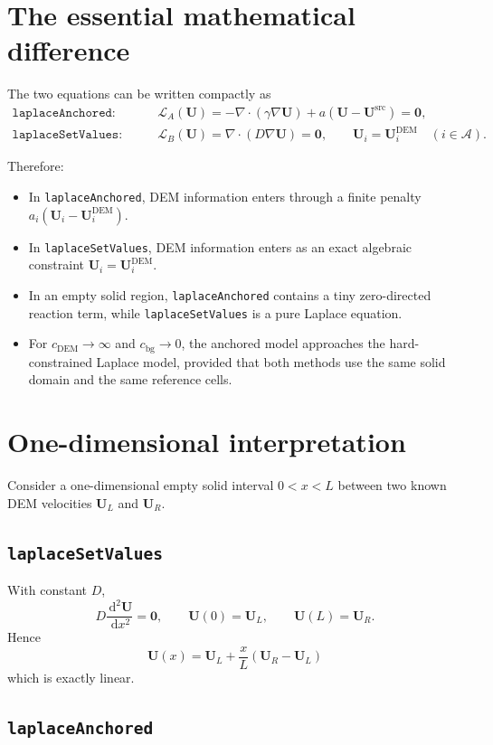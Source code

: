 \documentclass[11pt,a4paper]{article}
\newcommand{\U}{\bm{U}}
\newcommand{\Ud}{\bm{U}^{\mathrm{DEM}}}
\newcommand{\Usrc}{\bm{U}^{\mathrm{src}}}
\newcommand{\dd}{\,\mathrm{d}}
\begin{document}
\section{The essential mathematical difference}

The two equations can be written compactly as
\begin{align}
\texttt{laplaceAnchored:}\qquad
&
\mathcal L_A(\U)
=
-\nabla\cdot(\gamma\nabla\U)
+a(\U-\Usrc)
=
\bm0,
\label{eq:anchcompact}\\
\texttt{laplaceSetValues:}\qquad
&
\mathcal L_B(\U)
=
\nabla\cdot(D\nabla\U)
=
\bm0,
\qquad
\U_i=\Ud_i\quad(i\in\mathcal A).
\label{eq:setcompact}
\end{align}

Therefore:

\begin{itemize}[leftmargin=1.5em]
\item In \texttt{laplaceAnchored}, DEM information enters through a finite penalty
$a_i(\U_i-\Ud_i)$.
\item In \texttt{laplaceSetValues}, DEM information enters as an exact algebraic
constraint $\U_i=\Ud_i$.
\item In an empty solid region, \texttt{laplaceAnchored} contains a tiny
zero-directed reaction term, while \texttt{laplaceSetValues} is a pure Laplace equation.
\item For $c_{\mathrm{DEM}}\rightarrow\infty$ and
$c_{\mathrm{bg}}\rightarrow0$, the anchored model approaches the hard-constrained
Laplace model, provided that both methods use the same solid domain and the same
reference cells.
\end{itemize}

\section{One-dimensional interpretation}

Consider a one-dimensional empty solid interval $0<x<L$ between two known DEM
velocities $\U_L$ and $\U_R$.

\subsection*{\texttt{laplaceSetValues}}

With constant $D$,
\[
D\frac{\dd^2\U}{\dd x^2}=\bm0,
\qquad
\U(0)=\U_L,
\qquad
\U(L)=\U_R.
\]
Hence
\[
\boxed{
\U(x)
=
\U_L+\frac{x}{L}\left(\U_R-\U_L\right)
}
\]
which is exactly linear.

\subsection*{\texttt{laplaceAnchored}}
\end{document}
